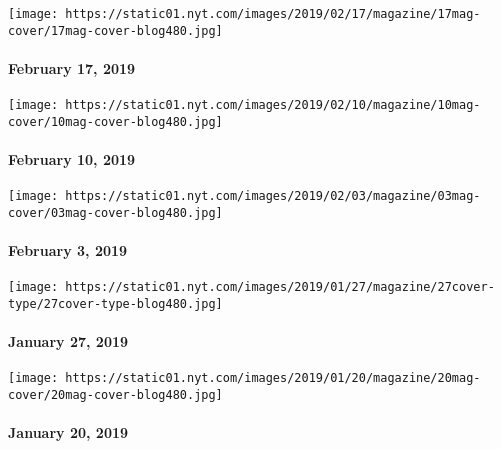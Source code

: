 \href{https://www.nytimes.com/issue/magazine/2019/02/19/the-21719-issue}{}

\texttt{[image: https://static01.nyt.com/images/2019/02/17/magazine/17mag-cover/17mag-cover-blog480.jpg]}

\hypertarget{february-17-2019}{%
\paragraph{February 17, 2019}\label{february-17-2019}}

\href{https://www.nytimes.com/issue/magazine/2019/02/08/the-021019-issue}{}

\texttt{[image: https://static01.nyt.com/images/2019/02/10/magazine/10mag-cover/10mag-cover-blog480.jpg]}

\hypertarget{february-10-2019}{%
\paragraph{February 10, 2019}\label{february-10-2019}}

\href{https://www.nytimes.com/issue/magazine/2019/02/08/the-020319-issue}{}

\texttt{[image: https://static01.nyt.com/images/2019/02/03/magazine/03mag-cover/03mag-cover-blog480.jpg]}

\hypertarget{february-3-2019}{%
\paragraph{February 3, 2019}\label{february-3-2019}}

\href{https://www.nytimes.com/issue/magazine/2019/01/28/the-12719-issue}{}

\texttt{[image: https://static01.nyt.com/images/2019/01/27/magazine/27cover-type/27cover-type-blog480.jpg]}

\hypertarget{january-27-2019}{%
\paragraph{January 27, 2019}\label{january-27-2019}}

\href{https://www.nytimes.com/issue/magazine/2019/01/18/the-12019-issue}{}

\texttt{[image: https://static01.nyt.com/images/2019/01/20/magazine/20mag-cover/20mag-cover-blog480.jpg]}

\hypertarget{january-20-2019}{%
\paragraph{January 20, 2019}\label{january-20-2019}}

